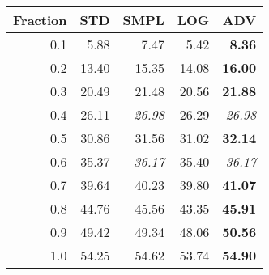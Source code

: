 \documentclass{standalone}
\begin{document}
\begin{tabular}{r|rrrr}
      \toprule
      Fraction & STD & SMPL & LOG & ADV\\
      \midrule
      0.1 & 5.88 & 7.47 & 5.42 & \textbf{8.36}\\
  0.2 & 13.40 & 15.35 & 14.08 & \textbf{16.00}\\
  0.3 & 20.49 & 21.48 & 20.56 & \textbf{21.88}\\
  0.4 & 26.11 & \emph{26.98} & 26.29 & \emph{26.98}\\
  0.5 & 30.86 & 31.56 & 31.02 & \textbf{32.14}\\
  0.6 & 35.37 & \emph{36.17} & 35.40 & \emph{36.17}\\
  0.7 & 39.64 & 40.23 & 39.80 & \textbf{41.07}\\
  0.8 & 44.76 & 45.56 & 43.35 & \textbf{45.91}\\
  0.9 & 49.42 & 49.34 & 48.06 & \textbf{50.56}\\
  1.0 & 54.25 & 54.62 & 53.74 & \textbf{54.90}\\
  \bottomrule
\end{tabular}
\end{document}
